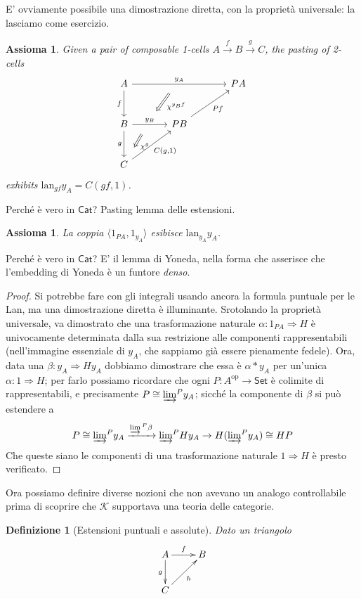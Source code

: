 \documentclass[11pt]{article}
\def\Cat{\mathsf{Cat}}
\def\Set{\mathsf{Set}}
\def\xto#1{\xrightarrow{#1}}
\def\To{\Rightarrow}
\def\opp{\mathrm{op}}
\def\lan{\mathrm{lan}}
\theoremstyle{reference}
\newtheorem{definition}[theorem]{Definizione}
\newtheorem{axiom}[theorem]{Assioma}
\begin{document}
E' ovviamente possibile una dimostrazione diretta, con la proprietà universale: la lasciamo come esercizio.
\begin{axiom}
Given a pair of composable 1-cells $A \xto{f} B\xto{g} C$, the
pasting of 2-cells
$$ \begin{tikzcd}[column sep=large, row sep=large] A\ar[d, "f"']\ar[rr, "y_A"{name=yonA}] && P A\\ B \ar[r, "y_B"{name=yonB}]\ar[d, "g"'] & P B\ar[ur, "P f"']\\ C\ar[ur, "{C(g,1)}"'] \ar[from=yonA, to=yonB, shorten >=2mm, shorten <=4mm, Rightarrow, "\chi^{y_B f}"] \ar[from=yonB, shorten >=4mm, shorten <=4mm, Rightarrow, "\chi^g"] \end{tikzcd} $$
exhibits $\lan_{gf}y_A = C(gf,1)$.
\end{axiom}
Perché è vero in \(\Cat\)? Pasting lemma delle estensioni.
\begin{axiom}
La coppia $\langle 1_{PA}, 1_{y_A} \rangle$ esibisce $\lan_{y_A}y_A$.
\end{axiom}
Perché è vero in \(\Cat\)? E' il lemma di Yoneda, nella forma che asserisce che l'embedding di Yoneda è un funtore \emph{denso}.
\begin{proof}
Si potrebbe fare con gli integrali usando ancora la formula
puntuale per le Lan, ma una dimostrazione diretta è
illuminante. Srotolando la proprietà universale, va
dimostrato che una trasformazione naturale $\alpha : 1_{PA}
\To H$ è univocamente determinata dalla sua restrizione alle
componenti rappresentabili (nell'immagine essenziale di
$y_A$, che sappiamo già essere pienamente fedele). Ora, data
una $\beta : y_A\To Hy_A$ dobbiamo dimostrare che essa è
$\alpha *y_A$ per un'unica $\alpha : 1\To H$; per farlo
possiamo ricordare che ogni $P : A^\opp\to \Set$ è colimite
di rappresentabili, e precisamente $P \cong
\varinjlim\!{}^Py_A$; sicché la componente di $\beta$ si può
estendere a
$$
P \cong \varinjlim\!{}^P y_A \xto{\varinjlim{}^P\beta} \varinjlim\!{}^P H y_A \to H(\varinjlim\!{}^P  y_A ) \cong HP
$$
Che queste siano le componenti di una trasformazione naturale $1 \To H$ è presto verificato.
\end{proof}


Ora possiamo definire diverse nozioni che non avevano un
analogo controllabile prima di scoprire che \(\mathcal K\)
supportava una teoria delle categorie.

\begin{definition}[Estensioni puntuali e assolute]
Dato un triangolo
\[
\xymatrix{
A \ar[r]^f\ar[d]_g & B \\
C \ar[ur]_h & 
}
\] 
\end{definition}
\end{document}
